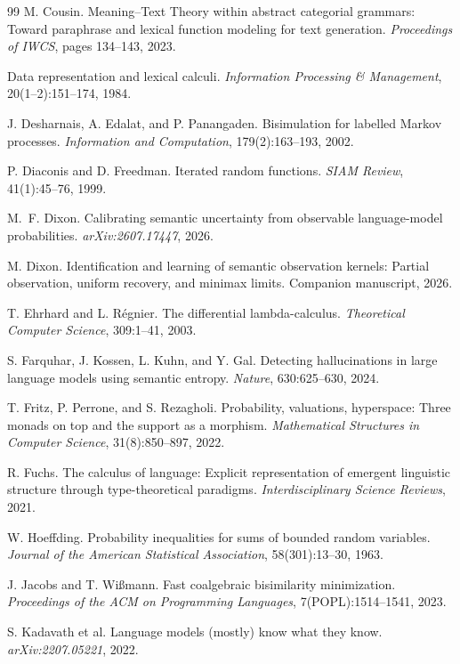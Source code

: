 \documentclass[11pt]{article}
\begin{document}
\begin{thebibliography}{99}
M. Cousin.
Meaning--Text Theory within abstract categorial grammars: Toward paraphrase and lexical function modeling for text generation.
\emph{Proceedings of IWCS}, pages 134--143, 2023.

Data representation and lexical calculi.
\emph{Information Processing \& Management}, 20(1--2):151--174, 1984.

J. Desharnais, A. Edalat, and P. Panangaden.
Bisimulation for labelled Markov processes.
\emph{Information and Computation}, 179(2):163--193, 2002.

P. Diaconis and D. Freedman.
Iterated random functions.
\emph{SIAM Review}, 41(1):45--76, 1999.

M.~F. Dixon.
Calibrating semantic uncertainty from observable language-model probabilities.
\emph{arXiv:2607.17447}, 2026.

M. Dixon.
Identification and learning of semantic observation kernels: Partial
observation, uniform recovery, and minimax limits.
Companion manuscript, 2026.

T. Ehrhard and L. R\'egnier.
The differential lambda-calculus.
\emph{Theoretical Computer Science}, 309:1--41, 2003.

S. Farquhar, J. Kossen, L. Kuhn, and Y. Gal.
Detecting hallucinations in large language models using semantic entropy.
\emph{Nature}, 630:625--630, 2024.

T. Fritz, P. Perrone, and S. Rezagholi.
Probability, valuations, hyperspace: Three monads on top and the support as a morphism.
\emph{Mathematical Structures in Computer Science}, 31(8):850--897, 2022.

R. Fuchs.
The calculus of language: Explicit representation of emergent linguistic structure through type-theoretical paradigms.
\emph{Interdisciplinary Science Reviews}, 2021.

W. Hoeffding.
Probability inequalities for sums of bounded random variables.
\emph{Journal of the American Statistical Association}, 58(301):13--30, 1963.

J. Jacobs and T. Wi{\ss}mann.
Fast coalgebraic bisimilarity minimization.
\emph{Proceedings of the ACM on Programming Languages}, 7(POPL):1514--1541, 2023.

S. Kadavath et al.
Language models (mostly) know what they know.
\emph{arXiv:2207.05221}, 2022.


\end{thebibliography}
\end{document}
